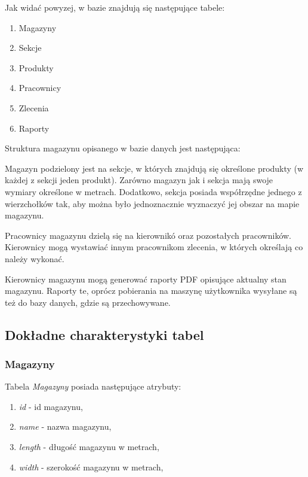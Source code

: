 \documentclass[]{article}
\begin{document}
    Jak widać powyzej, w bazie znajdują się następujące tabele:
    \begin{enumerate}
        \item Magazyny
        \item Sekcje
        \item Produkty
        \item Pracownicy
        \item Zlecenia
        \item Raporty
    \end{enumerate}

    Struktura magazynu opisanego w bazie danych jest następująca:

    \bigskip
    Magazyn podzielony jest na sekcje, w których znajdują się określone produkty (w każdej z sekcji jeden produkt). Zarówno magazyn jak i sekcja mają swoje wymiary określone w metrach. Dodatkowo, sekcja posiada współrzędne jednego z wierzchołków tak, aby można było jednoznacznie wyznaczyć jej obszar na mapie magazynu.

    \bigskip
    Pracownicy magazynu dzielą się na kierownikó oraz pozostałych pracowników. Kierownicy mogą wystawiać innym pracownikom zlecenia, w których określają co należy wykonać.

    \bigskip
    Kierownicy magazynu mogą generować raporty PDF opisujące aktualny stan magazynu. Raporty te, oprócz pobierania na maszynę użytkownika wysyłane są też do bazy danych, gdzie są przechowywane.

    \subsection{Dokładne charakterystyki tabel}
    \subsubsection{Magazyny}
    Tabela \textit{Magazyny} posiada następujące atrybuty:
    \begin{enumerate}
        \item \textit{id} - id magazynu,
        \item \textit{name} - nazwa magazynu,
        \item \textit{length} - długość magazynu w metrach,
        \item \textit{width} - szerokość magazynu w metrach,
    \end{enumerate}
\end{document}
